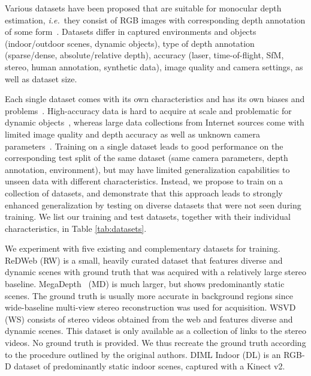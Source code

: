 Various datasets have been proposed that are suitable for monocular depth estimation, \MakeLowercase{\textit{i.e.}}\ they consist of RGB images with corresponding depth annotation of some form~\cite{Saxena2009,Butler2012,Geiger2012,Silberman2012,Sturm2012,MenzeGeiger2015,Song2015,Cordts2016,Chen2016,Dai2017,
Knapitsch2017,Schoeps2017,LiSnavely2018,Kim2018,Xian2018,Cho2019,Li2019,Vasiljevic2019,Wang2019}.
Datasets differ in captured environments and objects (indoor/outdoor scenes, dynamic objects), type of depth annotation (sparse/dense, absolute/relative depth), accuracy (laser, time-of-flight, SfM, stereo, human annotation, synthetic data), image quality and camera settings, as well as dataset size.

Each single dataset comes with its own characteristics and has its own biases and problems~\cite{TorralbaEfros2011}. High-accuracy data is hard to acquire at scale and problematic for dynamic objects~\cite{Knapitsch2017,Schoeps2017}, whereas large data collections from Internet sources come with limited image quality and depth accuracy as well as unknown camera parameters~\cite{Chen2016,Wang2019}. Training on a single dataset leads to good performance on the corresponding test split of the same dataset (same camera parameters, depth annotation, environment), but may have limited generalization capabilities to unseen data with different characteristics. Instead, we propose to train on a collection of datasets, and demonstrate that this approach leads to strongly enhanced generalization by testing on diverse datasets that were not seen during training. We list our training and test datasets, together with their individual characteristics, in Table \ref{tab:datasets}.

 We experiment with five existing and complementary datasets for training. ReDWeb \cite{Xian2018} (RW) is a small, heavily curated dataset that features diverse and dynamic scenes with ground truth that was acquired with a relatively large stereo baseline. MegaDepth~\cite{LiSnavely2018} (MD) is much larger, but shows predominantly static scenes. The ground truth is usually more accurate in background regions since wide-baseline multi-view stereo reconstruction was used for acquisition. WSVD~\cite{Wang2019} (WS) consists of stereo videos obtained from the web and features diverse and dynamic scenes. This dataset is only available as a collection of links to the stereo videos. No ground truth is provided. We thus recreate the ground truth according to the procedure outlined by the original authors. DIML Indoor \cite{Kim2018} (DL) is an RGB-D dataset of predominantly static indoor scenes, captured with a Kinect v2.

